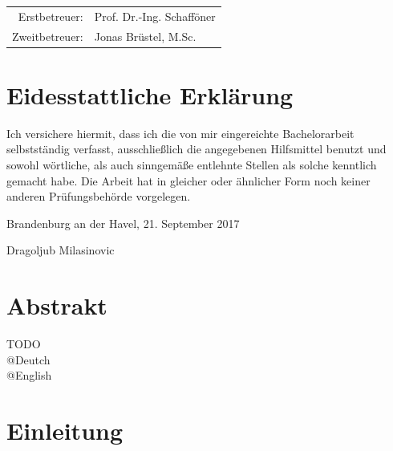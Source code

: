 \documentclass[
12pt,
english,
ngerman,
headsepline,
twoside,
openright,
numbers=noenddot,version=first
]{scrreprt}
\providecommand{\tabularnewline}{\\}
\let\myTOC\tableofcontents
\renewcommand\tableofcontents{
\begin{spacing}{1.1}
\myTOC
\end{spacing}
\clearpage
\pagenumbering{arabic}
}
\begin{document}
\vspace{1cm}

\noindent \begin{center}
\medskip{}
\begin{tabular}{rl}
Erstbetreuer: & Prof. Dr.-Ing. Schafföner\tabularnewline
Zweitbetreuer: & Jonas Brüstel, M.Sc.\tabularnewline
\end{tabular}
\par\end{center}

\noindent \begin{center}
{\huge }
\par\end{center}{\huge \par}

\newpage{}

%
\tableofcontents{}

\pagestyle{scrheadings}

\chapter*{Eidesstattliche Erklärung}

Ich versichere hiermit, dass ich die von mir eingereichte Bachelorarbeit selbstständig verfasst, ausschließlich die angegebenen Hilfsmittel benutzt und sowohl wörtliche, als auch sinngemäße entlehnte Stellen als solche kenntlich gemacht habe. Die Arbeit hat in gleicher oder ähnlicher Form noch keiner anderen Prüfungsbehörde vorgelegen.

Brandenburg an der Havel, 21. September 2017

\vspace{3cm}

Dragoljub Milasinovic

\chapter*{Abstrakt}
TODO \\
@Deutch \\
@English

\chapter{Einleitung}
\setcounter{page}{1}
\label{chap:introduction}
\end{document}
